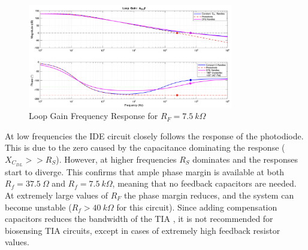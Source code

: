 \begin{figure}[H]
    \centering
        \centering
        \includegraphics[width=0.8\textwidth]{MatLabLG_7500.png}
    \caption{Loop Gain Frequency Response for $R_F=7.5~k\Omega$}
    \label{fig:matlab_lg}
\end{figure}
At low frequencies the IDE circuit closely follows the response of the photodiode. This is due to the zero caused by the capacitance dominating the response ($X_{C_{DL}}>>R_S$). However, at higher frequencies $R_S$ dominates and the responses start to diverge. This confirms that ample phase margin is available at both $R_f=37.5~\Omega$ and $R_f=7.5~k\Omega$, meaning that no feedback capacitors are needed. At extremely large values of $R_F$ the phase margin reduces, and the system can become unstable ($R_f>40~k\Omega$ for this circuit). Since adding compensation capacitors reduces the bandwidth of the TIA \cite{StabilizeYourTransimpedance}, it is not recommended for biosensing TIA circuits, except in cases of extremely high feedback resistor values.


